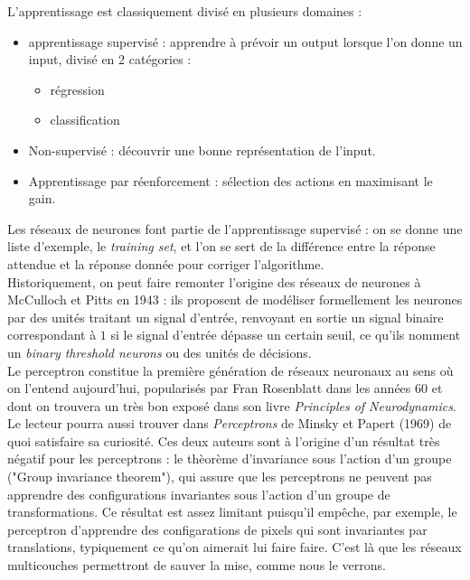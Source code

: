\documentclass{article}
\begin{document}
L'apprentissage est classiquement divisé en plusieurs domaines :
\begin{itemize}
\item apprentissage supervisé : apprendre à prévoir un output lorsque l'on donne un input, divisé en 2 catégories :
\begin{itemize}
\item régression 
\item classification
\end{itemize}
\item Non-supervisé : découvrir une bonne représentation de l'input.
\item Apprentissage par réenforcement : sélection des actions en maximisant le gain.\\
\end{itemize}
Les réseaux de neurones font partie de l'apprentissage supervisé : on se donne une liste d'exemple, le \textit{training set}, et l'on se sert de la différence entre la réponse attendue et la réponse donnée pour corriger l'algorithme.\\

Historiquement, on peut faire remonter l'origine des réseaux de neurones à McCulloch et Pitts en 1943 : ils proposent de modéliser formellement les neurones par des unités traitant un signal d'entrée, renvoyant en sortie un signal binaire correspondant à $1$ si le signal d'entrée dépasse un certain seuil, ce qu'ils nomment un \textit{binary threshold neurons} ou des unités de décisions.\\

Le perceptron constitue la première génération de réseaux neuronaux au sens où on l'entend aujourd'hui, popularisés par Fran Rosenblatt dans les années 60 et dont on trouvera un très bon exposé dans son livre \textit{Principles of Neurodynamics}.\\

Le lecteur pourra aussi trouver dans \textit{Perceptrons} de Minsky et Papert (1969) de quoi satisfaire sa curiosité. Ces deux auteurs sont à l'origine d'un résultat très négatif pour les perceptrons : le thèorème d'invariance sous l'action d'un groupe ("Group invariance theorem"), qui assure que les perceptrons ne peuvent pas apprendre des configurations invariantes sous l'action d'un groupe de transformations. Ce résultat est assez limitant puisqu'il empêche, par exemple, le perceptron d'apprendre des configarations de pixels qui sont invariantes par translations, typiquement ce qu'on aimerait lui faire faire. C'est là que les réseaux multicouches permettront de sauver la mise, comme nous le verrons.\\
\end{document}
